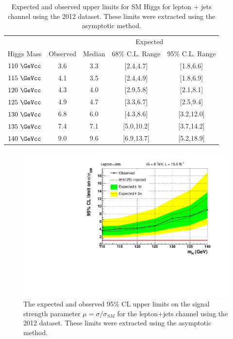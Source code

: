 \begin{table}[hbtp] 
  \centering 
{\footnotesize
\begin{tabular}{|c|c|ccc|} \hline 
           &          & \multicolumn{3}{c|}{Expected} \\
Higgs Mass & Observed & Median & 68\% C.L. Range &  95\% C.L. Range  \\ \hline
$110~\GeVcc$ & 3.6 & 3.3 & [2.4,4.7] & [1.8,6.6] \\
$115~\GeVcc$ & 4.1 & 3.5 & [2.4,4.9] & [1.8,6.9] \\
$120~\GeVcc$ & 4.3 & 4.0 & [2.9,5.8] & [2.1,8.1] \\
$125~\GeVcc$ & 4.9 & 4.7 & [3.3,6.7] & [2.5,9.4] \\
$130~\GeVcc$ & 6.8 & 6.0 & [4.3,8.6] & [3.2,12.0] \\
$135~\GeVcc$ & 7.4 & 7.1 & [5.0,10.2] & [3.7,14.2] \\
$140~\GeVcc$ & 9.0 & 9.6 & [6.9,13.7] & [5.2,18.9] \\
\hline
\end{tabular}}
    \caption{Expected and observed upper limits for SM Higgs for lepton + jets channel using the 2012 dataset.  These limits were extracted using the asymptotic method.} 	
  \label{tab:lvjj_limitTable_II}
\end{table} 

\begin{figure}[hbtp] 
  {\centering
    \includegraphics[width=1.0\textwidth]{Figures/Analysis_2_Diagrams/limits_lj_injected_ttH_mH_limit_ExpAndObs_shape.pdf}
    \caption{The expected and observed 95\% CL upper limits on the signal strength parameter $\mu = \sigma / \sigma_{SM}$ for the lepton+jets channel using the 2012 dataset.  These limits were extracted using the asymptotic method.}
    \label{fig:lvjj_limit_II}}
\end{figure}

